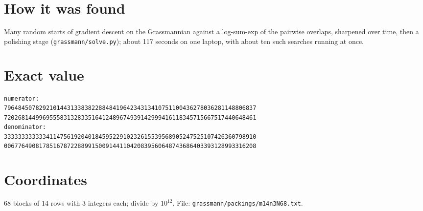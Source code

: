 \documentclass[11pt,a4paper]{article}
\begin{document}
\section{How it was found}
Many random starts of gradient descent on the Grassmannian against a log-sum-exp of the pairwise overlaps, sharpened over time, then a polishing stage (\texttt{grassmann/solve.py}); about 117 seconds on one laptop, with about ten such searches running at once.


\appendix
\section{Exact value}
{\small
\begin{verbatim}
numerator:
796484507829210144313383822884841964234313410751100436278036281148806837
720268144996955583132833516412489674939142999416118345715667517440648461
denominator:
333333333333411475619204018459522910232615539568905247525107426360798910
006776490817851678722889915009144110420839560648743686403393128993316208
\end{verbatim}}

\section{Coordinates}
68 blocks of 14 rows with 3 integers each; divide by $10^{12}$. File: \texttt{grassmann/packings/m14n3N68.txt}.
{\tiny
\begin{multicols}{3}
\end{multicols}}
\end{document}
